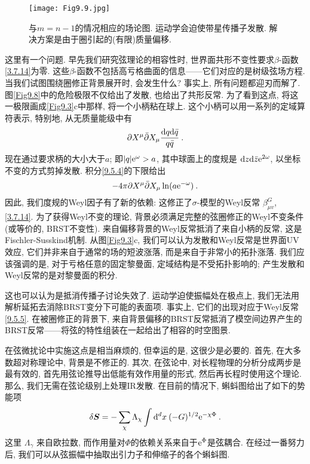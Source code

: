 \begin{figure}
	\begin{center}
		\texttt{[image: Fig9.9.jpg]}\\
		\caption{与$m=n{-}1$的情况相应的场论图. 运动学会迫使带星传播子发散. 解决方案是由于圈引起的(有限)质量偏移.}\label{Fig9.9}
	\end{center}
\end{figure}


这里有一个问题. 早先我们研究弦理论的相容性时, 世界面共形不变性要求$\beta$-函数\eqref{3.7.14}为零. 
这些$\beta$-函数不包括高亏格曲面的信息——它们对应的是树级弦场方程. 当我们试图围绕圈修正背景展开时, 会发生什么? 
事实上, 所有问题都迎刃而解了. 图\ref{Fig9.8}中的危险极限不仅给出了发散, 也给出了共形反常. 为了看到这点, 
将这一极限画成\ref{Fig9.3}c中那样, 将一个小柄粘在球上. 这个小柄可以用一系列的定域算符表示, 特别地, 从无质量能级中有
\begin{equation}
	\partial X^{\mu} \bar{\partial} X_{\mu} \frac{\mathrm{d} q \mathrm{d} \bar{q}}{q \bar{q}} \:. \label{9.5.4}
\end{equation}
现在通过要求柄的大小大于$a$; 即$|q| \mathrm{e}^{\omega}>a$, 其中球面上的度规是 $\mathrm{d} z \mathrm{d} \bar{z} \mathrm{e}^{2 \omega}$,  
以坐标不变的方式剪掉发散. 积分\eqref{9.5.4}的下限给出
\begin{equation}
	-4 \pi \partial X^{\mu} \bar{\partial} X_{\mu} \ln (a \mathrm{e}^{-\omega}) \:. \label{9.5.5}
\end{equation}
因此, 我们度规的Weyl因子有了新的依赖: 这修正了$\sigma$-模型的Weyl反常 $\beta_{\mu v}^{G}$, \eqref{3.7.14}. 
为了获得Weyl不变的理论, 背景必须满足完整的弦圈修正的Weyl不变条件 (或等价的, BRST不变性). 
来自偏移背景的Weyl反常抵消了来自小柄的反常, 这是Fischler-Susskind机制. 从图\ref{Fig9.3}c, 我们可以认为发散和Weyl反常是世界面UV效应, 
它们并非来自于通常的场的短波涨落, 而是来自于非常小的拓扑涨落. 我们应该强调的是, 对于亏格任意的固定黎曼面, 定域结构是不受拓扑影响的; 
产生发散和Weyl反常的是对黎曼面的积分. 

这也可以认为是抵消传播子讨论失效了. 运动学迫使振幅处在极点上, 我们无法用解析延拓去消除BRST变分下可能的表面项. 
事实上, 它们的出现对应于Weyl反常\eqref{9.5.5}. 在被圈修正的背景下, 来自背景偏移的BRST反常抵消了模空间边界产生的BRST反常——将弦的特性组装在一起给出了相容的时空图景.

在弦微扰论中实施这点是相当麻烦的, 但幸运的是, 这很少是必要的. 首先, 在大多数超对称理论中, 背景是不修正的. 
其次, 在弦论中, 对长程物理的分析分成两步是最有效的, 首先用弦论推导出低能有效作用量的形式, 然后再长程时使用这个理论. 
那么, 我们无需在弦论级别上处理IR发散. 在目前的情况下, 蝌蚪图给出了如下的势能项
\begin{equation}
	\delta \bm{S}=-\sum_{\chi} \Lambda_{\chi} \int \mathrm{d}^{d} x \: (-G)^{1/2} \mathrm{e}^{-\chi \Phi} \:. \label{9.5.6}
\end{equation}
这里 $\Lambda_{\gamma}$ 来自欧拉数, 而作用量对$\Phi$的依赖关系来自于$\mathrm{e}^{\Phi}$是弦耦合. 
在经过一番努力后, 我们可以从弦振幅中抽取出引力子和伸缩子的各个蝌蚪图.

